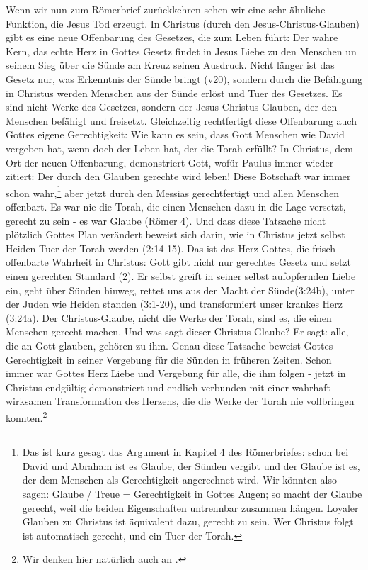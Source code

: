 Wenn wir nun zum Römerbrief zurückkehren sehen wir eine sehr ähnliche Funktion, die Jesus Tod erzeugt.
In Christus (durch den Jesus-Christus-Glauben) gibt es eine neue Offenbarung des Gesetzes, die zum Leben führt:
Der wahre Kern, das echte Herz in Gottes Gesetz findet in Jesus Liebe zu den Menschen un seinem Sieg über die Sünde am Kreuz seinen Ausdruck.
Nicht länger ist das Gesetz nur, was Erkenntnis der Sünde bringt (v20), sondern durch die Befähigung in Christus
werden Menschen aus der Sünde erlöst und Tuer des Gesetzes.
Es sind nicht Werke des Gesetzes, sondern der Jesus-Christus-Glauben, der den Menschen befähigt und freisetzt.
Gleichzeitig rechtfertigt diese Offenbarung auch Gottes eigene Gerechtigkeit:
Wie kann es sein, dass Gott Menschen wie David vergeben hat, wenn doch der Leben hat, der die Torah erfüllt?
In Christus, dem Ort der neuen Offenbarung, demonstriert Gott, wofür Paulus immer wieder  zitiert:
Der durch den Glauben gerechte wird leben!
Diese Botschaft war immer schon wahr,\footnote{
	Das ist kurz gesagt das Argument in Kapitel 4 des Römerbriefes:
	schon bei David und Abraham ist es Glaube, der Sünden vergibt und der Glaube ist es, der dem Menschen als Gerechtigkeit angerechnet wird.
	Wir könnten also sagen: Glaube / Treue = Gerechtigkeit in Gottes Augen; so macht der Glaube gerecht, weil die beiden Eigenschaften untrennbar zusammen hängen.
	Loyaler Glauben zu Christus ist äquivalent dazu, gerecht zu sein.
	Wer Christus folgt ist automatisch gerecht, und ein Tuer der Torah.
}
aber jetzt durch den Messias gerechtfertigt und allen Menschen offenbart.
Es war nie die Torah, die einen Menschen dazu in die Lage versetzt, gerecht zu sein - es war Glaube (Römer 4).
Und dass diese Tatsache nicht plötzlich Gottes Plan verändert beweist sich darin, wie in Christus jetzt selbst Heiden Tuer der Torah werden (2:14-15).
Das ist das Herz Gottes, die frisch offenbarte Wahrheit in Christus: Gott gibt nicht nur gerechtes Gesetz und setzt einen gerechten Standard (2).
Er selbst greift in seiner selbst aufopfernden Liebe ein, geht über Sünden hinweg, rettet uns aus der Macht der Sünde(3:24b), unter der Juden wie Heiden standen (3:1-20),
und transformiert unser krankes Herz (3:24a).
Der Christus-Glaube, nicht die Werke der Torah, sind es, die einen Menschen gerecht machen.
Und was sagt dieser Christus-Glaube?
Er sagt: alle, die an Gott glauben, gehören zu ihm.
Genau diese Tatsache beweist Gottes Gerechtigkeit in seiner Vergebung für die Sünden in früheren Zeiten.
Schon immer war Gottes Herz Liebe und Vergebung für alle, die ihm folgen - jetzt in Christus endgültig demonstriert und endlich
verbunden mit einer wahrhaft wirksamen Transformation des Herzens, die die Werke der Torah nie vollbringen konnten.\footnote{
	Wir denken hier natürlich auch an .
}


